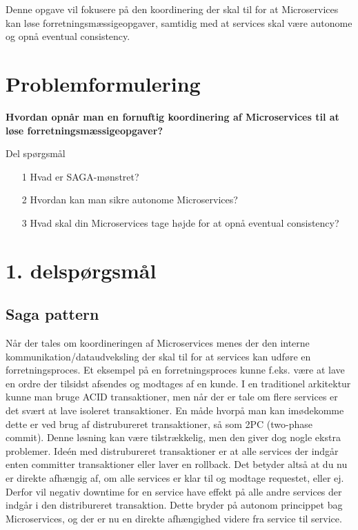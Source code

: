 \documentclass[12pt]{article} %
\begin{document}
\noindent
Denne opgave vil fokusere på den koordinering der skal til for at Microservices kan løse forretningsmæssigeopgaver, samtidig med at services skal være autonome og opnå eventual consistency.
\newline

\newpage
\section{ Problemformulering }

\textbf{Hvordan opnår man en fornuftig koordinering af Microservices til at løse forretningsmæssigeopgaver?}
\newline

\noindent
Del spørgsmål

\begin{itemize}
  \item[1] Hvad er SAGA-mønstret?
  \item[2] Hvordan kan man sikre autonome Microservices?
  \item[3] Hvad skal din Microservices tage højde for at opnå eventual consistency?
\end{itemize}

\section{ 1. delspørgsmål }
\subsection{ Saga pattern }
Når der tales om koordineringen af Microservices menes der den interne kommunikation/dataudveksling der skal til for at services kan udføre en forretningsproces. Et eksempel på en forretningsproces kunne f.eks. være at lave en ordre der tilsidst afsendes og modtages af en kunde. I en traditionel arkitektur kunne man bruge ACID transaktioner, men når der er tale om flere services er det svært at lave isoleret transaktioner. En måde hvorpå man kan imødekomme dette er ved brug af distrubureret transaktioner, så som 2PC (two-phase commit). Denne løsning kan være tilstrækkelig, men den giver dog nogle ekstra problemer. Ideén med distrubureret transaktioner er at alle services der indgår enten committer transaktioner eller laver en rollback. Det betyder altså at du nu er direkte afhængig af, om alle services er klar til og modtage requestet, eller ej. Derfor vil negativ downtime for en service have effekt på alle andre services der indgår i den distribureret transaktion\cite{richardson2019microservices}. Dette bryder på autonom princippet bag Microservices, og der er nu en direkte afhængighed videre fra service til service.
\newline
\end{document}
